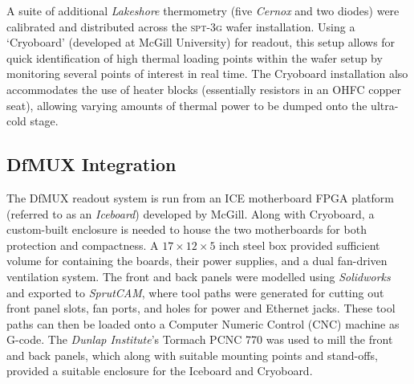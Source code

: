 \documentclass[iop]{emulateapj}
\begin{document}
A suite of additional \textit{Lakeshore} thermometry (five \textit{Cernox} and two diodes) were calibrated and distributed across the \textsc{spt-3g} wafer installation.  Using a `Cryoboard' (developed at McGill University) for readout, this setup allows for quick identification of high thermal loading points within the wafer setup by monitoring several points of interest in real time.  The Cryoboard installation also accommodates the use of heater blocks (essentially resistors in an OHFC copper seat), allowing varying amounts of thermal power to be dumped onto the ultra-cold stage.


\subsection{DfMUX Integration}

The DfMUX readout system is run from an ICE motherboard FPGA platform (referred to as an \textit{Iceboard}) developed by McGill.  Along with Cryoboard, a custom-built enclosure is needed to house the two motherboards for both protection and compactness.  A $17\times12\times5$ inch steel box provided sufficient volume for containing the boards, their power supplies, and a dual fan-driven ventilation system.  The front and back panels were modelled using \textit{Solidworks} and exported to \textit{SprutCAM}, where tool paths were generated for cutting out front panel slots, fan ports, and holes for power and Ethernet jacks.  These tool paths can then be loaded onto a Computer Numeric Control (CNC) machine as G-code.  The \textit{Dunlap Institute}'s Tormach PCNC 770 was used to mill the front and back panels, which along with suitable mounting points and stand-offs, provided a suitable enclosure for the Iceboard and Cryoboard.
\end{document}
